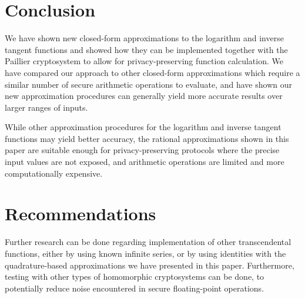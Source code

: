 \section{Conclusion}
We have shown new closed-form approximations to the logarithm and inverse tangent functions and showed how they can be implemented together with the Paillier cryptosystem to allow for privacy-preserving function calculation. We have compared our approach to other closed-form approximations which require a similar number of secure arithmetic operations to evaluate, and have shown our new approximation procedures can generally yield more accurate results over larger ranges of inputs.

While other approximation procedures for the logarithm and inverse tangent functions may yield better accuracy, the rational approximations shown in this paper are suitable enough for privacy-preserving protocols where the precise input values are not exposed, and arithmetic operations are limited and more computationally expensive.

\section{Recommendations}
Further research can be done regarding implementation of other transcendental functions, either by using known infinite series, or by using identities with the quadrature-based approximations we have presented in this paper. Furthermore, testing with other types of homomorphic cryptosystems can be done, to potentially reduce noise encountered in secure floating-point operations.

